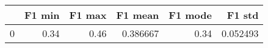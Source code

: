 \begin{tabular}{lrrrrr}
\toprule
{} &  F1 min &  F1 max &   F1 mean &  F1 mode &    F1 std \\
\midrule
0 &    0.34 &    0.46 &  0.386667 &     0.34 &  0.052493 \\
\bottomrule
\end{tabular}
